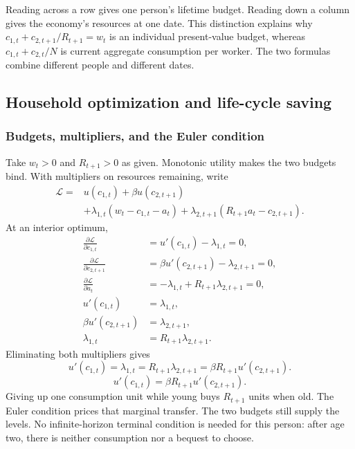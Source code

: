 Reading across a row gives one person's lifetime budget. Reading down a
column gives the economy's resources at one date. This distinction explains
why $c_{1,t}+c_{2,t+1}/R_{t+1}=w_t$ is an individual present-value budget,
whereas $c_{1,t}+c_{2,t}/N$ is current aggregate consumption per worker.
The two formulas combine different people and different dates.

\subsection{Household optimization and life-cycle saving}

\subsubsection{Budgets, multipliers, and the Euler condition}

Take $w_t>0$ and $R_{t+1}>0$ as given. Monotonic utility makes the two budgets
bind. With multipliers on resources remaining, write
\begin{equation}
\begin{split}
\mathscr L={}&u(c_{1,t})+\beta u(c_{2,t+1})\\
&+\lambda_{1,t}(w_t-c_{1,t}-a_t)
+\lambda_{2,t+1}(R_{t+1}a_t-c_{2,t+1}).
\end{split}
\end{equation}
At an interior optimum,
\begin{align}
\frac{\partial\mathscr L}{\partial c_{1,t}}
 &=u'(c_{1,t})-\lambda_{1,t}=0,\\
\frac{\partial\mathscr L}{\partial c_{2,t+1}}
 &=\beta u'(c_{2,t+1})-\lambda_{2,t+1}=0,\\
\frac{\partial\mathscr L}{\partial a_t}
 &=-\lambda_{1,t}+R_{t+1}\lambda_{2,t+1}=0,\\
u'(c_{1,t})&=\lambda_{1,t},\\
\beta u'(c_{2,t+1})&=\lambda_{2,t+1},\\
\lambda_{1,t}&=R_{t+1}\lambda_{2,t+1}.
\end{align}
Eliminating both multipliers gives
\[
u'(c_{1,t})=\lambda_{1,t}
 =R_{t+1}\lambda_{2,t+1}
 =\beta R_{t+1}u'(c_{2,t+1}).
\]
\begin{equation}\label{eq:olg-euler}
u'(c_{1,t})=\beta R_{t+1}u'(c_{2,t+1}).
\end{equation}
Giving up one consumption unit while young buys $R_{t+1}$ units when old.
The Euler condition prices that marginal transfer. The two budgets still
supply the levels. No infinite-horizon terminal condition is needed for this
person: after age two, there is neither consumption nor a bequest to choose.

